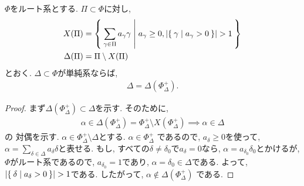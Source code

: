 \begin{lemma}
  \label{lem:simplesumissimplesystem:}
  $\Phi$をルート系とする.
  $\Pi\subset \Phi$に対し,
  \begin{align*}
    X(\Pi)&= \Set{\sum_{\gamma\in\Pi}a_\gamma\gamma| a_\gamma\geq 0, \numof{\Set{\gamma|a_\gamma>0}}>1}\\
    \Delta(\Pi)&= \Pi \setminus X(\Pi)
  \end{align*}
  とおく.
  $\Delta\subset \Phi$が単純系ならば,
  \begin{align*}
    \Delta=\Delta(\Phi_\Delta^+).
  \end{align*}
\end{lemma}
\begin{proof}
  まず$\Delta(\Phi_\Delta^{+})\subset \Delta$を示す.
  そのために,
  \begin{align*}
    \alpha\in\Delta(\Phi_\Delta^{+})=\Phi_\Delta^+\setminus X(\Phi_\Delta^+)\implies \alpha \in\Delta
  \end{align*}
  の
  対偶を示す.
  $\alpha \in \Phi_\Delta^+\setminus\Delta$とする.
  $\alpha\in \Phi_\Delta^+$
  であるので,
  $a_\delta \geq 0$を使って,
  $\alpha=\sum_{\delta\in\Delta}a_\delta \delta$と表せる.
  もし, すべての$\delta\neq\delta_0$で$a_\delta=0$なら,
  $\alpha=a_{\delta_0} \delta_0$とかけるが,
  $\Phi$がルート系であるので, $a_{\delta_0}=1$であり,
  $\alpha=\delta_0\in\Delta$である.
  よって, $\numof{\Set{\delta|a_\delta>0}}>1$である.
  したがって, $\alpha\not\in \Delta(\Phi_\Delta^+)$
  である.



\end{proof}

